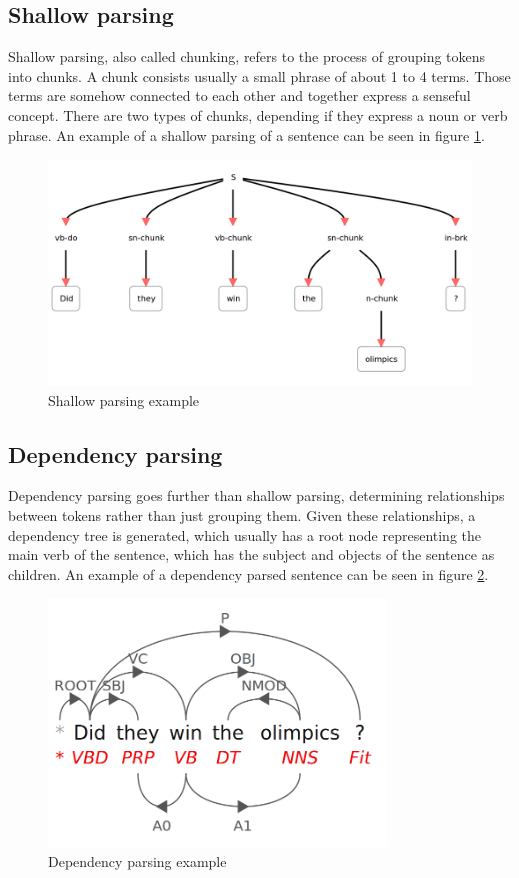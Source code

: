\documentclass{bsu-ms}
\begin{document}
\subsection{Shallow parsing}
Shallow parsing, also called chunking, refers to the process of grouping tokens into chunks. A chunk consists usually a small phrase of about 1 to 4 terms. Those terms are somehow connected to each other and together express a senseful concept. There are two types of chunks, depending if they express a noun or verb phrase. An example of a shallow parsing of a sentence can be seen in figure \ref{fig:shallow}.

\begin{figure}[h!]
\centering
\includegraphics[width=\textwidth]{shallow}
\caption{Shallow parsing example}
\label{fig:shallow}
\end{figure}



\subsection{Dependency parsing}
Dependency parsing goes further than shallow parsing, determining relationships between tokens rather than just grouping them. Given these relationships, a dependency tree is generated, which usually has a root node representing the main verb of the sentence, which has the subject and objects of the sentence as children. An example of a dependency parsed sentence can be seen in figure \ref{fig:dependency}.

\begin{figure}[h!]
\centering
\includegraphics[width=0.8\textwidth]{dependency}
\caption{Dependency parsing example}
\label{fig:dependency}
\end{figure}
\end{document}
